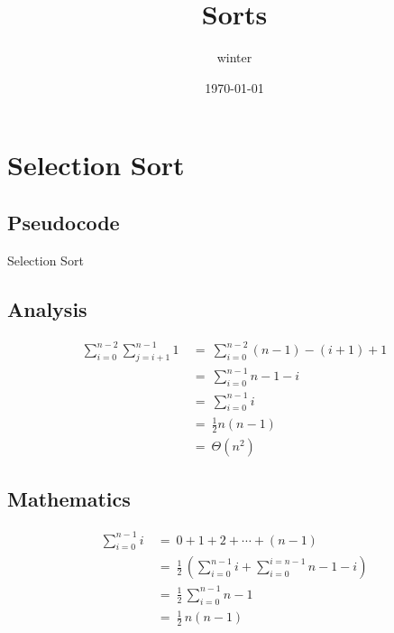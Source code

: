 \documentclass{article}
\title{\heiti Sorts}
\author{winter}
\date{\today}
\begin{document}
\section{Selection Sort}
\subsection{Pseudocode}

\begin{algorithm}
  \caption{Selection Sort}
  \DontPrintSemicolon
\end{algorithm}

\subsection{Analysis}
\begin{align*}
    \sum_{i=0}^{n-2}\sum_{j=i+1}^{n-1} 1  \ 
        &=\  \sum_{i=0}^{n-2} {(n-1)-(i+1) + 1} \\
        &=\  \sum_{i=0}^{n-1} {n-1-i} \\
        &=\  \sum_{i=0}^{n-1} i \\
        &=\  \frac{1}{2}n(n-1) \\
        &=\  \Theta(n^2)
\end{align*}

\subsection{Mathematics}
    \begin{align*}
        \sum_{i=0}^{n-1} i\ 
        &=\  0 + 1 + 2 + \cdots + (n-1)\\
        &=\  \frac{1}{2}\, (\sum_{i=0}^{n-1} i  + \sum_{i=0}^{i=n-1} n-1-i) \\
        &=\  \frac{1}{2}\, \sum_{i=0}^{n-1} n-1\\
        &=\  \frac{1}{2}\, n(n-1)
    \end{align*}
\end{document}
